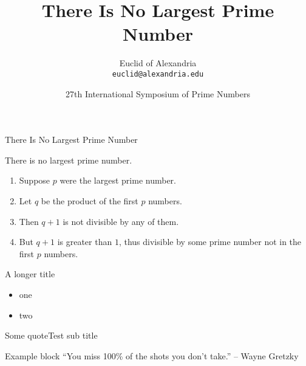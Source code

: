 \documentclass[12pt,aspectratio=169,presentation]{beamer}
\title{There Is No Largest Prime Number}
\date[ISPN ’80]{27th International Symposium of Prime Numbers}
\author[Euclid]{Euclid of Alexandria\\\texttt{euclid@alexandria.edu}}
\begin{document}
\acefaiddutitleframe

\begin{frame}{There Is No Largest Prime Number}
  \begin{theorem}
    There is no largest prime number. \end{theorem}
  \begin{enumerate}
  \item<1-| alert@1> Suppose \(p\) were the largest prime number.
  \item<2-> Let \(q\) be the product of the first \(p\) numbers.
  \item<3-> Then \(q+1\) is not divisible by any of them.
  \item<1-> But \(q + 1\) is greater than \(1\), thus divisible by some prime
    number not in the first \(p\) numbers.
  \end{enumerate}
\end{frame}

\begin{frame}{A longer title}
  \begin{itemize}
  \item one
  \item two
  \end{itemize}
\end{frame}

\begin{frame}{Some quote}{Test sub title}
  \begin{block}{Example block}
    {\large ``You miss 100\% of the shots you don't take.'' – Wayne Gretzky}
    \vspace{\baselineskip}

    \hspace*{}
  \end{block}
\end{frame}
\end{document}

